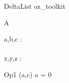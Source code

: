 \begin{zsection}
  \SECTION DeltaList \parents oz\_toolkit
\end{zsection}

\begin{class}{A}
  \begin{state}
    a,b,c : \nat\\
  \Delta\\
    x,y,z : \nat
  \end{state}
  \begin{op}{Op1}
    \Delta (a,c)
  \where
    a = 0
  \end{op}
\end{class}
